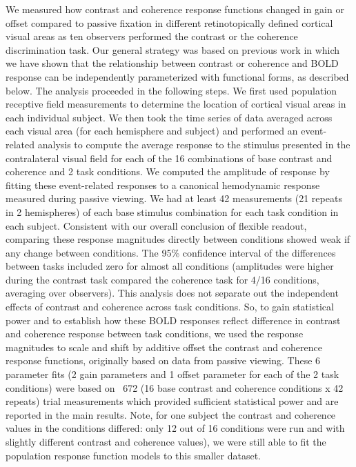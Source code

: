 We measured how contrast and coherence response functions changed in gain or offset compared to passive fixation in different retinotopically defined cortical visual areas as ten observers performed the contrast or the coherence discrimination task. Our general strategy was based on previous work \citep{Birman2018-sp} in which we have shown that the relationship between contrast or coherence and BOLD response can be independently parameterized with functional forms, as described below. The analysis proceeded in the following steps. We first used population receptive field measurements \citep{Dumoulin2008-uc} to determine the location of cortical visual areas in each individual subject. We then took the time series of data averaged across each visual area (for each hemisphere and subject) and performed an event-related analysis to compute the average response to the stimulus presented in the contralateral visual field for each of the 16 combinations of base contrast and coherence and 2 task conditions. We computed the amplitude of response by fitting these event-related responses to a canonical hemodynamic response measured during passive viewing. We had at least 42 measurements (21 repeats in 2 hemispheres) of each base stimulus combination for each task condition in each subject. Consistent with our overall conclusion of flexible readout, comparing these response magnitudes directly between conditions showed weak if any change between conditions. The 95\% confidence interval of the differences between tasks included zero for almost all conditions (amplitudes were higher during the contrast task compared the coherence task for 4/16 conditions, averaging over observers). This analysis does not separate out the independent effects of contrast and coherence across task conditions. So, to gain statistical power and to establish how these BOLD responses reflect difference in contrast and coherence response between task conditions, we used the response magnitudes to scale and shift by additive offset the contrast and coherence response functions, originally based on data from passive viewing. These 6 parameter fits (2 gain parameters and 1 offset parameter for each of the 2 task conditions) were based on ~672 (16 base contrast and coherence conditions x 42 repeats) trial measurements which provided sufficient statistical power and are reported in the main results. Note, for one subject the contrast and coherence values in the conditions differed: only 12 out of 16 conditions were run and with slightly different contrast and coherence values), we were still able to fit the population response function models to this smaller dataset. 

